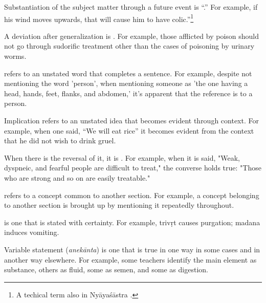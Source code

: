 \begin{translation}
\item [17] Substantiation of the subject matter through a future event is
“.” For example, if his wind moves upwards, that
will cause him to have colic.”\footnote{A techical term also in
    Nyāyaśāstra \citep[6--7]{jhal-1978}.}


\item [18] A deviation after generalization is . For 
example, those afflicted by poison should not go through sudorific treatment 
other 
than the cases of poisoning by urinary worms.

\item [19]  refers to an 
unstated word that 
completes a sentence. For example, despite not mentioning the word 'person',
when mentioning someone as 'the one having a head, hands, feet, flanks, and 
abdomen,' it's apparent that the reference is to a person. 

\item [20] Implication refers to an unstated idea 
that becomes evident through context. For example, when one said, “We will 
eat rice” it becomes evident from the context that he did not wish to drink 
gruel. 

\item [21] When there is the reversal of it, it is . 
For example, when it is said, "Weak, dyspneic, and fearful people are difficult to 
treat," the converse holds true: "Those who are strong and so on are easily 
treatable." 

\item [22]  refers to a concept common to 
another section. For example, a concept belonging to another section is brought 
up 
by mentioning it repeatedly throughout.\label{65:prasanga}

\item [23]  is one that 
is stated with certainty. For example, \gls{trivṛt} causes purgation; 
\gls{madana} induces vomiting.

\item [24] Variable statement (\emph{anekānta}) is one that is true in one way in 
some cases and in another way elsewhere. For example, some teachers identify 
the main element as substance, others as fluid, some as semen, and some as 
digestion.


\end{translation}
